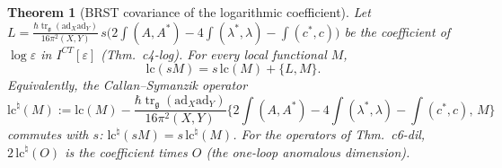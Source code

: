 \documentclass[11pt]{article}
\numberwithin{equation}{section}
\theoremstyle{plain}
\newtheorem{theorem}{Theorem}[section]
\theoremstyle{definition}
\begin{document}
\begin{theorem}[BRST covariance of the logarithmic coefficient]
\label{thm:tl-brst}
Let $L=\frac{\hbar\operatorname{tr}_{\mathfrak g}(\mathrm{ad}_X\mathrm{ad}_Y)}{16\pi^2(X,Y)}\,s\big(2\int(A,A^*)-4\int(\lambda^*,\lambda)-\int(c^*,c)\big)$ be the coefficient of $\log\varepsilon$ in $I^{CT}[\varepsilon]$ (Thm.~c4-log). For every local functional $M$,
\begin{equation}
\mathrm{lc}(sM)=s\,\mathrm{lc}(M)+\{L,M\}.
\label{eq:tl-brst}
\end{equation}
Equivalently, the Callan--Symanzik operator
\[
\mathrm{lc}^\natural(M):=\mathrm{lc}(M)-\frac{\hbar\operatorname{tr}_{\mathfrak g}(\mathrm{ad}_X\mathrm{ad}_Y)}{16\pi^2(X,Y)}\Big\{2\int(A,A^*)-4\int(\lambda^*,\lambda)-\int(c^*,c),\,M\Big\}
\]
commutes with $s$: $\mathrm{lc}^\natural(sM)=s\,\mathrm{lc}^\natural(M)$. For the operators of Thm.~c6-dil, $2\,\mathrm{lc}^\natural(O)$ is the coefficient times $O$ (the one-loop anomalous dimension).
\end{theorem}
\end{document}
